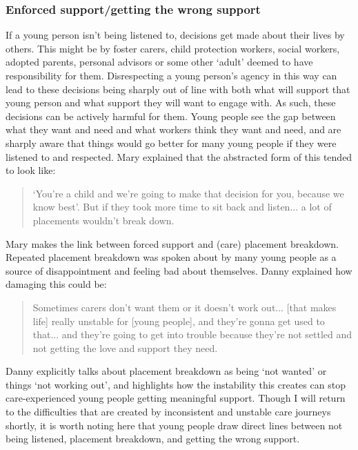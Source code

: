 \subsubsection{Enforced support/getting the wrong support}
If a young person isn't being listened to, decisions get made about their lives by others. This might be by foster carers, child protection workers, social workers, adopted parents, personal advisors or some other `adult' deemed to have responsibility for them. Disrespecting a young person's agency in this way can lead to these decisions being sharply out of line with both what will support that young person and what support they will want to engage with. As such, these decisions can be actively harmful for them. Young people see the gap between what they want and need and what workers think they want and need, and are sharply aware that things would go better for many young people if they were listened to and respected. Mary explained that the abstracted form of this tended to look like:
\begin{quote}
`You're a child and we're going to make that decision for you, because we know best'. But if they took more time to sit back and listen... a lot of placements wouldn't break down.
\end{quote}
Mary makes the link between forced support and (care) placement breakdown. Repeated placement breakdown was spoken about by many young people as a source of disappointment and feeling bad about themselves. Danny explained how damaging this could be:
\begin{quote}
Sometimes carers don't want them or it doesn't work out... [that makes life] really unstable for [young people], and they're gonna get used to that... and they're going to get into trouble because they're not settled and not getting the love and support they need.
\end{quote}
Danny explicitly talks about placement breakdown as being `not wanted' or things `not working out', and highlights how the instability this creates can stop care-experienced young people getting meaningful support. Though I will return to the difficulties that are created by inconsistent and unstable care journeys shortly, it is worth noting here that young people draw direct lines between not being listened, placement breakdown, and getting the wrong support.

